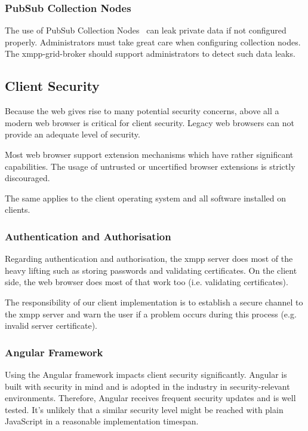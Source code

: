 \subsubsection{PubSub Collection Nodes}

The use of PubSub Collection Nodes~\cite{xep-0248} can leak private data if not configured properly.
Administrators must take great care when configuring collection nodes.
The \gls{xmpp-grid-broker} should support administrators to detect such data leaks.

\subsection{Client Security}

Because the web gives rise to many potential security concerns, above all a modern web browser is critical for client security.
Legacy web browsers can not provide an adequate level of security.~\cite{firefox-update-security}

Most web browser support extension mechanisms which have rather significant capabilities.
The usage of untrusted or uncertified browser extensions is strictly discouraged.~\cite{browser-extension-security}

The same applies to the client operating system and all software installed on clients.

\subsubsection{Authentication and Authorisation}

Regarding authentication and authorisation, the \gls{xmpp} server does most of the heavy lifting such as storing passwords and validating certificates.
On the client side, the web browser does most of that work too (i.e. validating certificates).

The responsibility of our client implementation is to establish a secure channel to the \gls{xmpp} server and warn the user if a problem occurs during this process (e.g. invalid server certificate).

\subsubsection{Angular Framework}

Using the Angular framework impacts client security significantly.
Angular is built with security in mind and is adopted in the industry in security-relevant environments.
Therefore, Angular receives frequent security updates and is well tested.
It's unlikely that a similar security level might be reached with plain JavaScript in a reasonable implementation timespan.

